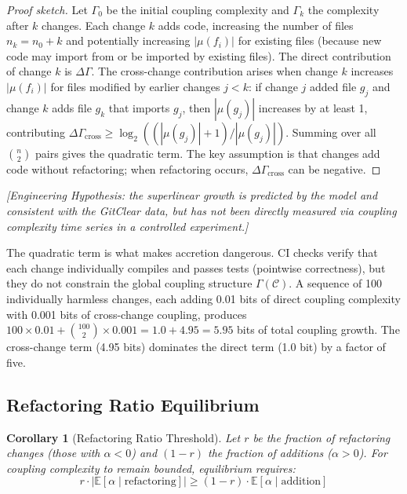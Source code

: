 \documentclass[11pt, a4paper, copyright]{googledeepmind}
\newtheorem{corollary}{Corollary}[section]
\newcommand{\E}{\mathbb{E}}
\begin{document}
\begin{proof}[Proof sketch]
Let $\Gamma_0$ be the initial coupling complexity and $\Gamma_k$ the complexity after $k$ changes. Each change $k$ adds code, increasing the number of files $n_k = n_0 + k$ and potentially increasing $|\mu(f_i)|$ for existing files (because new code may import from or be imported by existing files). The direct contribution of change $k$ is $\Delta \Gamma$. The cross-change contribution arises when change $k$ increases $|\mu(f_i)|$ for files modified by earlier changes $j < k$: if change $j$ added file $g_j$ and change $k$ adds file $g_k$ that imports $g_j$, then $|\mu(g_j)|$ increases by at least 1, contributing $\Delta \Gamma_{\text{cross}} \geq \log_2((|\mu(g_j)|+1)/|\mu(g_j)|)$. Summing over all $\binom{n}{2}$ pairs gives the quadratic term. The key assumption is that changes add code without refactoring; when refactoring occurs, $\Delta \Gamma_{\text{cross}}$ can be negative.
\end{proof}

\emph{[Engineering Hypothesis: the superlinear growth is predicted by the model and consistent with the GitClear data, but has not been directly measured via coupling complexity time series in a controlled experiment.]}

The quadratic term is what makes accretion dangerous. CI checks verify that each change individually compiles and passes tests (pointwise correctness), but they do not constrain the global coupling structure $\Gamma(\mathcal{C})$. A sequence of 100 individually harmless changes, each adding 0.01 bits of direct coupling complexity with 0.001 bits of cross-change coupling, produces $100 \times 0.01 + \binom{100}{2} \times 0.001 = 1.0 + 4.95 = 5.95$ bits of total coupling growth. The cross-change term (4.95 bits) dominates the direct term (1.0 bit) by a factor of five.

\subsection{Refactoring Ratio Equilibrium}

\begin{corollary}[Refactoring Ratio Threshold]
\label{cor:refactoring}
Let $r$ be the fraction of refactoring changes (those with $\alpha < 0$) and $(1-r)$ the fraction of additions ($\alpha > 0$). For coupling complexity to remain bounded, equilibrium requires:
\begin{equation}
r \cdot |\E[\alpha \mid \text{refactoring}]| \geq (1-r) \cdot \E[\alpha \mid \text{addition}]
\end{equation}
\end{corollary}
\end{document}
